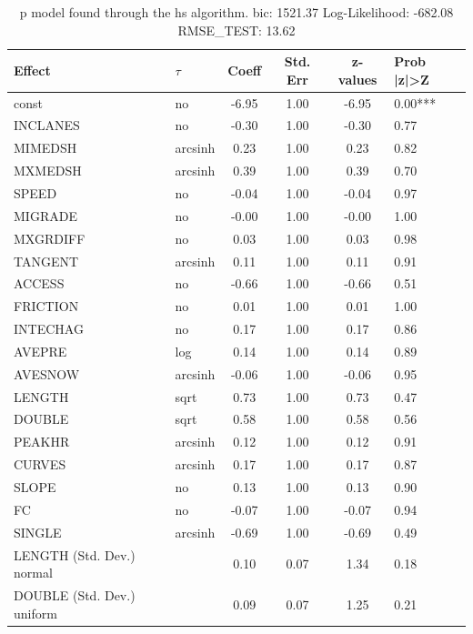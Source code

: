\begin{table}
	\caption{p model found through the hs algorithm. bic: 1521.37 Log-Likelihood: -682.08 RMSE_TEST: 13.62}
	\begin{center}
		\begin{tabular}{|l|l|c|c|c|l|}
			\hline
			Effect & $\tau$ & Coeff & Std. Err & z-values & Prob |z|>Z \\
			\hline
			const & no & -6.95 & 1.00 & -6.95 & 0.00*** \\
			\hline
			INCLANES & no & -0.30 & 1.00 & -0.30 & 0.77 \\
			\hline
			MIMEDSH & arcsinh & 0.23 & 1.00 & 0.23 & 0.82 \\
			\hline
			MXMEDSH & arcsinh & 0.39 & 1.00 & 0.39 & 0.70 \\
			\hline
			SPEED & no & -0.04 & 1.00 & -0.04 & 0.97 \\
			\hline
			MIGRADE & no & -0.00 & 1.00 & -0.00 & 1.00 \\
			\hline
			MXGRDIFF & no & 0.03 & 1.00 & 0.03 & 0.98 \\
			\hline
			TANGENT & arcsinh & 0.11 & 1.00 & 0.11 & 0.91 \\
			\hline
			ACCESS & no & -0.66 & 1.00 & -0.66 & 0.51 \\
			\hline
			FRICTION & no & 0.01 & 1.00 & 0.01 & 1.00 \\
			\hline
			INTECHAG & no & 0.17 & 1.00 & 0.17 & 0.86 \\
			\hline
			AVEPRE & log & 0.14 & 1.00 & 0.14 & 0.89 \\
			\hline
			AVESNOW & arcsinh & -0.06 & 1.00 & -0.06 & 0.95 \\
			\hline
			LENGTH & sqrt & 0.73 & 1.00 & 0.73 & 0.47 \\
			\hline
			DOUBLE & sqrt & 0.58 & 1.00 & 0.58 & 0.56 \\
			\hline
			PEAKHR & arcsinh & 0.12 & 1.00 & 0.12 & 0.91 \\
			\hline
			CURVES & arcsinh & 0.17 & 1.00 & 0.17 & 0.87 \\
			\hline
			SLOPE & no & 0.13 & 1.00 & 0.13 & 0.90 \\
			\hline
			FC & no & -0.07 & 1.00 & -0.07 & 0.94 \\
			\hline
			SINGLE & arcsinh & -0.69 & 1.00 & -0.69 & 0.49 \\
			\hline
			LENGTH (Std. Dev.) normal &  & 0.10 & 0.07 & 1.34 & 0.18 \\
			\hline
			DOUBLE (Std. Dev.) uniform &  & 0.09 & 0.07 & 1.25 & 0.21 \\

\end{tabular}
\end{center}
\end{table}

